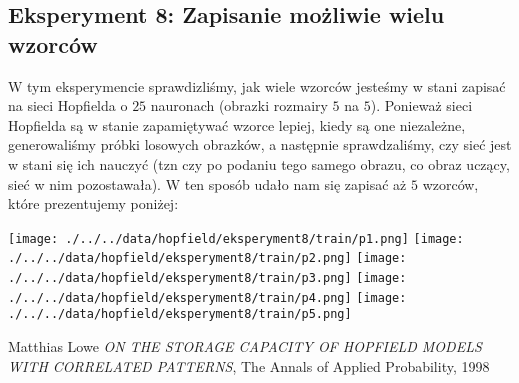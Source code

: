 \documentclass{article}
\begin{document}
\subsection{Eksperyment 8: Zapisanie możliwie wielu wzorców}
W tym eksperymencie sprawdizliśmy, jak wiele wzorców jesteśmy w stani zapisać na sieci Hopfielda o
$25$ nauronach (obrazki rozmairy $5$ na $5$). Ponieważ sieci Hopfielda są w stanie zapamiętywać 
wzorce lepiej, kiedy są one niezależne, generowaliśmy próbki losowych obrazków, a następnie sprawdzaliśmy,
czy sieć jest w stani się ich nauczyć (tzn czy po podaniu tego samego obrazu, co obraz uczący, sieć w nim pozostawała).
W ten sposób udało nam się zapisać aż $5$ wzorców, które prezentujemy poniżej:
\begin{center}
    \texttt{[image: ./../../data/hopfield/eksperyment8/train/p1.png]}
    \texttt{[image: ./../../data/hopfield/eksperyment8/train/p2.png]}
    \texttt{[image: ./../../data/hopfield/eksperyment8/train/p3.png]}
    \texttt{[image: ./../../data/hopfield/eksperyment8/train/p4.png]}
    \texttt{[image: ./../../data/hopfield/eksperyment8/train/p5.png]}
\end{center}
\begin{thebibliography}{9}

    Matthias Lowe
    \textit{ON THE STORAGE CAPACITY OF HOPFIELD
    MODELS WITH CORRELATED PATTERNS},
    The Annals of Applied Probability, 1998
\end{thebibliography}
\end{document}
